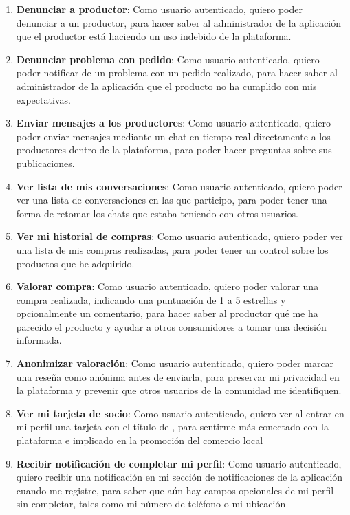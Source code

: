 \begin{enumerate}[label=HU-\protect\twodigits{\arabic*}:, align=left, leftmargin=*]
\item \textbf{Denunciar a productor}: Como usuario autenticado, quiero poder denunciar a un productor, para hacer saber al administrador de la aplicación que el productor está haciendo un uso indebido de la plataforma.

\item \textbf{Denunciar problema con pedido}: Como usuario autenticado, quiero poder notificar de un problema con un pedido realizado, para hacer saber al administrador de la aplicación que el producto no ha cumplido con mis expectativas.

\item \textbf{Enviar mensajes a los productores}: Como usuario autenticado, quiero poder enviar mensajes mediante un chat en tiempo real directamente a los productores dentro de la plataforma, para poder hacer preguntas sobre sus publicaciones.

\item \textbf{Ver lista de mis conversaciones}: Como usuario autenticado, quiero poder ver una lista de conversaciones en las que participo, para poder tener una forma de retomar los chats que estaba teniendo con otros usuarios.

\item \textbf{Ver mi historial de compras}: Como usuario autenticado, quiero poder ver una lista de mis compras realizadas, para poder tener un control sobre los productos que he adquirido.

\item \textbf{Valorar compra}: Como usuario autenticado, quiero poder valorar una compra realizada, indicando una puntuación de 1 a 5 estrellas y opcionalmente un comentario, para hacer saber al productor qué me ha parecido el producto y ayudar a otros consumidores a tomar una decisión informada.

\item \textbf{Anonimizar valoración}: Como usuario autenticado, quiero poder marcar una reseña como anónima antes de enviarla, para preservar mi privacidad en la plataforma y prevenir que otros usuarios de la comunidad me identifiquen.

\item \textbf{Ver mi tarjeta de socio}: Como usuario autenticado, quiero ver al entrar en mi perfil una tarjeta con el título de , para sentirme más conectado con la plataforma e implicado en la promoción del comercio local 

\item \textbf{Recibir notificación de completar mi perfil}: Como usuario autenticado, quiero recibir una notificación en mi sección de notificaciones de la aplicación cuando me registre, para saber que aún hay campos opcionales de mi perfil sin completar, tales como mi número de teléfono o mi ubicación


\end{enumerate}
